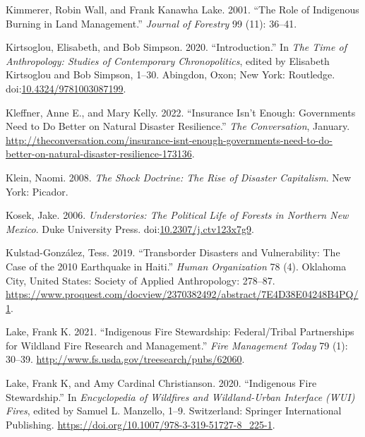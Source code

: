\documentclass[
]{article}
\newlength{\cslhangindent}
\newenvironment{CSLReferences}[2] %
 {\begin{list}{}{%
  \setlength{\itemindent}{0pt}
  \setlength{\leftmargin}{0pt}
  \setlength{\parsep}{0pt}
  \ifodd #1
   \setlength{\leftmargin}{\cslhangindent}
   \setlength{\itemindent}{-1\cslhangindent}
  \fi
  \setlength{\itemsep}{#2\baselineskip}}}
 {\end{list}}
\begin{document}
\begin{CSLReferences}{1}{0}
Kimmerer, Robin Wall, and Frank Kanawha Lake. 2001. {``The {Role} of {Indigenous Burning} in {Land Management}.''} \emph{Journal of Forestry} 99 (11): 36--41.

Kirtsoglou, Elisabeth, and Bob Simpson. 2020. {``Introduction.''} In \emph{The {Time} of {Anthropology}: {Studies} of {Contemporary Chronopolitics}}, edited by Elisabeth Kirtsoglou and Bob Simpson, 1--30. Abingdon, Oxon; New York: Routledge. doi:\href{https://doi.org/10.4324/9781003087199}{10.4324/9781003087199}.

Kleffner, Anne E., and Mary Kelly. 2022. {``Insurance Isn't Enough: {Governments} Need to Do Better on Natural Disaster Resilience.''} \emph{The Conversation}, January. \url{http://theconversation.com/insurance-isnt-enough-governments-need-to-do-better-on-natural-disaster-resilience-173136}.

Klein, Naomi. 2008. \emph{The Shock Doctrine: The Rise of Disaster Capitalism}. New York: Picador.

Kosek, Jake. 2006. \emph{Understories: {The Political Life} of {Forests} in {Northern New Mexico}}. Duke University Press. doi:\href{https://doi.org/10.2307/j.ctv123x7g9}{10.2307/j.ctv123x7g9}.

Kulstad-González, Tess. 2019. {``Transborder {Disasters} and {Vulnerability}: {The Case} of the 2010 {Earthquake} in {Haiti}.''} \emph{Human Organization} 78 (4). Oklahoma City, United States: Society of Applied Anthropology: 278--87. \url{https://www.proquest.com/docview/2370382492/abstract/7E4D38E04248B4PQ/1}.

Lake, Frank K. 2021. {``Indigenous Fire Stewardship: {Federal}/{Tribal} Partnerships for Wildland Fire Research and Management.''} \emph{Fire Management Today} 79 (1): 30--39. \url{http://www.fs.usda.gov/treesearch/pubs/62060}.

Lake, Frank K, and Amy Cardinal Christianson. 2020. {``Indigenous {Fire Stewardship}.''} In \emph{Encyclopedia of {Wildfires} and {Wildland-Urban Interface} ({WUI}) {Fires}}, edited by Samuel L. Manzello, 1--9. Switzerland: Springer International Publishing. \url{https://doi.org/10.1007/978-3-319-51727-8_225-1}.


\end{CSLReferences}
\end{document}
